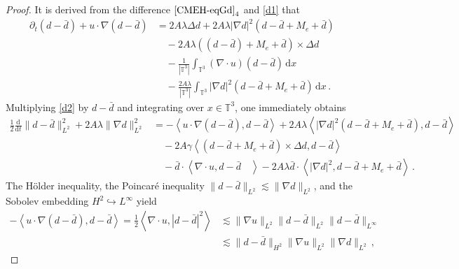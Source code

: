 \documentclass[reqno,11pt]{amsart}
\numberwithin{equation}{section}
\def\d{\mathrm{d}}
\begin{document}
\begin{proof}
It is derived from the difference $\eqref{CMEH-eqGd}_4$ and \eqref{d1} that
\begin{equation}\label{d2}
\begin{aligned}
\partial_t (d - \bar{d}) + u \cdot \nabla (d - \bar{d}) &= 2A\lambda \Delta d + 2A\lambda |\nabla d|^2 (d - \bar{d} +M_e + \bar{d}) \\
&\quad - 2A\lambda \left( (d - \bar{d}) +M_e + \bar{d} \right) \times \Delta d \\
&\quad - \frac{1}{|\mathbb{T}^3|} \int_{\mathbb{T}^3} (\nabla \cdot u)(d - \bar{d}) \, \d x \\
&\quad - \frac{2A\lambda}{|\mathbb{T}^3|} \int_{\mathbb{T}^3} |\nabla d|^2 (d - \bar{d} +M_e + \bar{d}) \, \d x \,.
\end{aligned}
\end{equation}
Multiplying \eqref{d2} by $d-\bar{d}$ and integrating over $x \in \mathbb{T}^3$, one immediately obtains 
  \begin{equation*}
\begin{aligned}  
\frac{1}{2} \frac{\d}{\d t} \| d - \bar{d} \|_{L^2}^2 + 2A\lambda \| \nabla d \|_{L^2}^2
&= -\left\langle u \cdot \nabla (d - \bar{d}), d - \bar{d} \right\rangle + 2A\lambda \left\langle |\nabla d|^2 (d - \bar{d} +M_e + \bar{d}), d - \bar{d} \right\rangle \\&
\quad - 2A\gamma \left\langle (d - \bar{d} +M_e + \bar{d}) \times \Delta d, d - \bar{d} \right\rangle \\&
\quad- \bar{d} \cdot \left\langle \nabla \cdot u, d - \bar{d} \quad \right\rangle - 2A\lambda \bar{d} \cdot \left\langle |\nabla d|^2, d - \bar{d} +M_e + \bar{d} \right\rangle \,.
\end{aligned}
\end{equation*}
The H\"older inequality, the Poincar\'e inequality $\| d - \bar{d} \|_{L^2} \lesssim \| \nabla d \|_{L^2}$, and the Sobolev embedding $H^2 \hookrightarrow L^\infty$ yield 
\begin{equation*}
\begin{aligned}  
 -\left\langle u \cdot \nabla (d - \bar{d}), d - \bar{d} \right\rangle = \frac{1}{2} \left\langle \nabla \cdot u, |d - \bar{d}|^2 \right\rangle & \lesssim \| \nabla u \|_{L^2} \| d - \bar{d} \|_{L^2} \| d - \bar{d} \|_{L^\infty} \\
 & \lesssim \| d - \bar{d} \|_{H^2} \| \nabla u \|_{L^2} \| \nabla d \|_{L^2} \,,
\end{aligned}
\end{equation*}

\end{proof}
\end{document}
